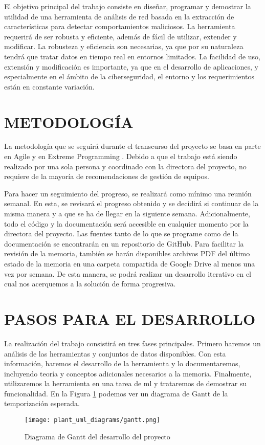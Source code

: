 El objetivo principal del trabajo consiste en diseñar, programar y demostrar la utilidad de una herramienta de análisis de red basada en la extracción de características para detectar comportamientos maliciosos. La herramienta requerirá de ser robusta y eficiente, además de fácil de utilizar, extender y modificar. La robusteza y eficiencia son necesarias, ya que por su naturaleza tendrá que tratar datos en tiempo real en entornos limitados. La facilidad de uso, extensión y modificación es importante, ya que en el desarrollo de aplicaciones, y especialmente en el ámbito de la ciberseguridad, el entorno y los requerimientos están en constante variación.

\color{blue}  %
\section*{METODOLOGÍA}

La metodología que se seguirá durante el transcurso del proyecto se basa en parte en Agile y en Extreme Programming \cite{extremeprogramming}. Debido a que el trabajo está siendo realizado por una sola persona y coordinado con la directora del proyecto, no requiere de la mayoría de recomendaciones de gestión de equipos. 

Para hacer un seguimiento del progreso, se realizará como mínimo una reunión semanal. En esta, se revisará el progreso obtenido y se decidirá si continuar de la misma manera y a que se ha de llegar en la siguiente semana. Adicionalmente, todo el código y la documentación será accesible en cualquier momento por la directora del proyecto. Las fuentes tanto de lo que se programe como de la documentación se encontrarán en un repositorio de GitHub. Para facilitar la revisión de la memoria, también se harán disponibles archivos PDF del último estado de la memoria en una carpeta compartida de Google Drive al menos una vez por semana. De esta manera, se podrá realizar un desarrollo iterativo en el cual nos acerquemos a la solución de forma progresiva.

\section*{PASOS PARA EL DESARROLLO}

La realización del trabajo consistirá en tres fases principales. Primero haremos un análisis de las herramientas y conjuntos de datos disponibles. Con esta información, haremos el desarrollo de la herramienta y lo documentaremos, incluyendo teoría y conceptos adicionales necesarios a la memoria. Finalmente, utilizaremos la herramienta en una tarea de \gls{ml} y trataremos de demostrar su funcionalidad. En la Figura \ref{fig:gantt} podemos ver un diagrama de Gantt de la temporización esperada.

\begin{figure}[H]
  \begin{center}
    \texttt{[image: plant\_uml\_diagrams/gantt.png]}
  \end{center}
  \caption{Diagrama de Gantt del desarrollo del proyecto}\label{fig:gantt}
\end{figure}

\color{black}  %